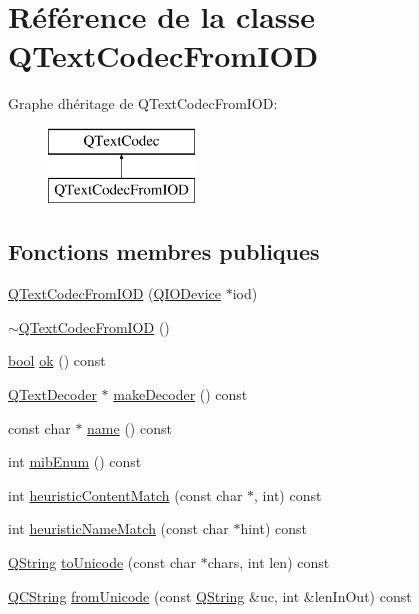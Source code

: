 \hypertarget{class_q_text_codec_from_i_o_d}{}\section{Référence de la classe Q\+Text\+Codec\+From\+I\+O\+D}
\label{class_q_text_codec_from_i_o_d}
Graphe d\textquotesingle{}héritage de Q\+Text\+Codec\+From\+I\+O\+D\+:\begin{figure}[H]
\begin{center}
\leavevmode
\includegraphics[height=2.000000cm]{class_q_text_codec_from_i_o_d}
\end{center}
\end{figure}
\subsection*{Fonctions membres publiques}
\begin{DoxyCompactItemize}
\item 
\hyperlink{class_q_text_codec_from_i_o_d_a385183a568f0cf30c2296766e55dcfc9}{Q\+Text\+Codec\+From\+I\+O\+D} (\hyperlink{class_q_i_o_device}{Q\+I\+O\+Device} $\ast$iod)
\item 
\hyperlink{class_q_text_codec_from_i_o_d_a237bc076c2d20666b87ff318535a27ba}{$\sim$\+Q\+Text\+Codec\+From\+I\+O\+D} ()
\item 
\hyperlink{qglobal_8h_a1062901a7428fdd9c7f180f5e01ea056}{bool} \hyperlink{class_q_text_codec_from_i_o_d_af0907b318ac01cebd7a39c8047326172}{ok} () const 
\item 
\hyperlink{class_q_text_decoder}{Q\+Text\+Decoder} $\ast$ \hyperlink{class_q_text_codec_from_i_o_d_a808719dfc27265c499864668812893f1}{make\+Decoder} () const 
\item 
const char $\ast$ \hyperlink{class_q_text_codec_from_i_o_d_a0bb1bb75ff0b55079c3f147c709e01fd}{name} () const 
\item 
int \hyperlink{class_q_text_codec_from_i_o_d_a58edffa2d1f21c39341f5877f6f073b3}{mib\+Enum} () const 
\item 
int \hyperlink{class_q_text_codec_from_i_o_d_a22dd4c14578e753858bc670f5ae0f88b}{heuristic\+Content\+Match} (const char $\ast$, int) const 
\item 
int \hyperlink{class_q_text_codec_from_i_o_d_a6553ce5f8178ec35f18570bb48880d87}{heuristic\+Name\+Match} (const char $\ast$hint) const 
\item 
\hyperlink{class_q_string}{Q\+String} \hyperlink{class_q_text_codec_from_i_o_d_a7c35c225d6608b6c323b79a919fec4dd}{to\+Unicode} (const char $\ast$chars, int len) const 
\item 
\hyperlink{class_q_c_string}{Q\+C\+String} \hyperlink{class_q_text_codec_from_i_o_d_ad01c06222a23095b828ab53db61cc25a}{from\+Unicode} (const \hyperlink{class_q_string}{Q\+String} \&uc, int \&len\+In\+Out) const 
\end{DoxyCompactItemize}
